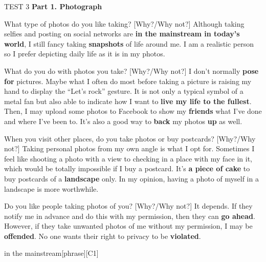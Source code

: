 \begin{glossarymc}[Cambridge 11]
    \begin{test}{TEST 3}
    \noindent
    \textbf{Part 1. Photograph}
    \begin{qa}{What type of photos do you like taking? [Why?/Why not?]}
    Although taking selfies and posting on social networks are \textbf{in the mainstream in today’s world}, I still fancy taking \textbf{snapshots} of life around me. I am a realistic person so I prefer depicting daily life as it is in my photos.
    \end{qa}

    \begin{qa}{What do you do with photos you take? [Why?/Why not?]}
    I don’t normally \textbf{pose for} pictures. Maybe what I often do most before taking a picture is raising my hand to display the “Let’s rock” gesture. It is not only a typical symbol of a metal fan but also able to indicate how I want to \textbf{live my life to the fullest}. Then, I may upload some photos to Facebook to show my \textbf{friends} what I’ve done and where I’ve been to. It’s also a good way to \textbf{back} my photos \textbf{up} as well.
    \end{qa}

    \begin{qa}{When you visit other places, do you take photos or buy postcards? [Why?/Why not?]}
    Taking personal photos from my own angle is what I opt for. Sometimes I feel like shooting a photo with a view to checking in a place with my face in it, which would be totally impossible if I buy a postcard. It’s \textbf{a piece of cake} to buy postcards of a \textbf{landscape} only. In my opinion, having a photo of myself in a landscape is more worthwhile.
    \end{qa}

    \begin{qa}{Do you like people taking photos of you? [Why?/Why not?]}
    It depends. If they notify me in advance and do this with my permission, then they can \textbf{go ahead}. However, if they take unwanted photos of me without my permission, I may be \textbf{offended}. No one wants their right to privacy to be \textbf{violated}.
    \end{qa}

        \begin{VocabExplain}[Part 1]
            \begin{ExplainCard}{in the mainstream}[phrase][C1]
            \end{ExplainCard}


\end{VocabExplain}
\end{test}
\end{glossarymc}
